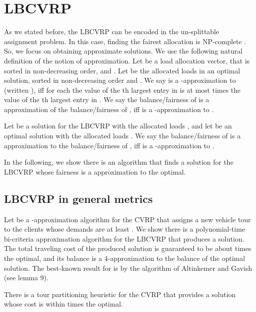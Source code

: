 \section{LBCVRP}
 \noindent As we stated before, the LBCVRP can be encoded in the un-splittable assignment problem. In this case, finding the fairest allocation is NP-complete \cite{Lenstra}. So, we focus on obtaining approximate solutions. We use the following natural definition of the notion of approximation. Let  be a load allocation vector, that is sorted in non-decreasing order, and . Let  be the allocated loads in an optimal solution, sorted in non-decreasing order and . We say  is a -approximation to  (written ), iff for each  the value of the th largest entry in  is at most  times the value of the th largest entry in . We say the balance/fairness of  is a approximation of the balance/fairness of , iff  is a -approximation to . 
 \begin{definition} Let  be a solution for the LBCVRP with the allocated loads , and let  be an optimal solution with the allocated loads . We say the balance/fairness of  is a approximation to the balance/fairness of , iff  is a -approximation to . 
\end{definition} 

 \indent In the following, we show there is an algorithm that finds a solution for the LBCVRP whose fairness is a approximation to the optimal.
  \subsection{LBCVRP in general metrics}
  \indent Let  be a -approximation algorithm for the CVRP that assigns a new vehicle tour to the clients whose demands are at least . We show there is a polynomial-time  bi-criteria approximation algorithm for the LBCVRP that produces a solution. The total traveling cost of the produced solution is guaranteed to be about  times the optimal, and its balance is a 4-approximation to the balance of the optimal solution. The best-known result for  is  by the algorithm of Altinkemer and Gavish \cite{Altinkemer1987} (see lemma 9). 
 \begin{lemma}  \cite{Altinkemer1987}
There is a tour partitioning heuristic for the CVRP that provides a solution whose cost is within  times the optimal.
\end{lemma} 

